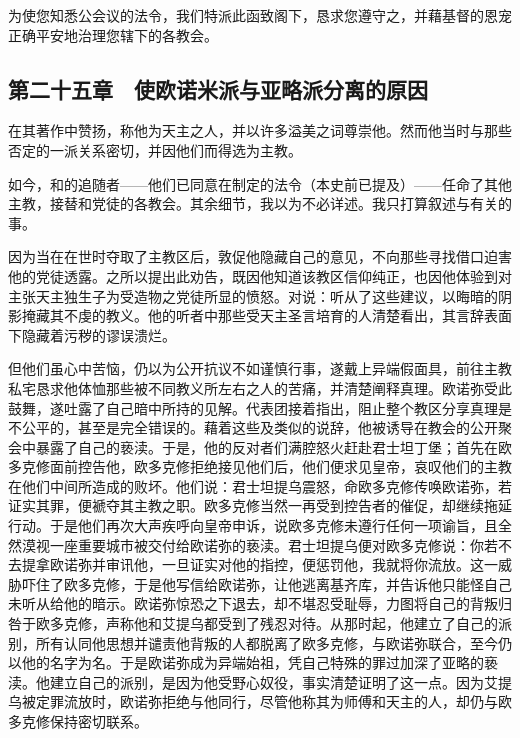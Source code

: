 为使您知悉公会议的法令，我们特派此函致阁下，恳求您遵守之，并藉基督的恩宠正确平安地治理您辖下的各教会。\par


\subsection{第二十五章　使欧诺米派与亚略派分离的原因}

在其著作中赞扬，称他为天主之人，并以许多溢美之词尊崇他。然而他当时与那些否定的一派关系密切，并因他们而得选为主教。\par

如今，和的追随者——他们已同意在制定的法令（本史前已提及）——任命了其他主教，接替和党徒的各教会。其余细节，我以为不必详述。我只打算叙述与有关的事。\par

因为当在在世时夺取了主教区后，敦促他隐藏自己的意见，不向那些寻找借口迫害他的党徒透露。之所以提出此劝告，既因他知道该教区信仰纯正，也因他体验到对主张天主独生子为受造物之党徒所显的愤怒。对说：听从了这些建议，以晦暗的阴影掩藏其不虔的教义。他的听者中那些受天主圣言培育的人清楚看出，其言辞表面下隐藏着污秽的谬误溃烂。\par

但他们虽心中苦恼，仍以为公开抗议不如谨慎行事，遂戴上异端假面具，前往主教私宅恳求他体恤那些被不同教义所左右之人的苦痛，并清楚阐释真理。欧诺弥受此鼓舞，遂吐露了自己暗中所持的见解。代表团接着指出，阻止整个教区分享真理是不公平的，甚至是完全错误的。藉着这些及类似的说辞，他被诱导在教会的公开聚会中暴露了自己的亵渎。于是，他的反对者们满腔怒火赶赴君士坦丁堡；首先在欧多克修面前控告他，欧多克修拒绝接见他们后，他们便求见皇帝，哀叹他们的主教在他们中间所造成的败坏。他们说：君士坦提乌震怒，命欧多克修传唤欧诺弥，若证实其罪，便褫夺其主教之职。欧多克修当然一再受到控告者的催促，却继续拖延行动。于是他们再次大声疾呼向皇帝申诉，说欧多克修未遵行任何一项谕旨，且全然漠视一座重要城市被交付给欧诺弥的亵渎。君士坦提乌便对欧多克修说：你若不去提拿欧诺弥并审讯他，一旦证实对他的指控，便惩罚他，我就将你流放。这一威胁吓住了欧多克修，于是他写信给欧诺弥，让他逃离基齐库，并告诉他只能怪自己未听从给他的暗示。欧诺弥惊恐之下退去，却不堪忍受耻辱，力图将自己的背叛归咎于欧多克修，声称他和艾提乌都受到了残忍对待。从那时起，他建立了自己的派别，所有认同他思想并谴责他背叛的人都脱离了欧多克修，与欧诺弥联合，至今仍以他的名字为名。于是欧诺弥成为异端始祖，凭自己特殊的罪过加深了亚略的亵渎。他建立自己的派别，是因为他受野心奴役，事实清楚证明了这一点。因为艾提乌被定罪流放时，欧诺弥拒绝与他同行，尽管他称其为师傅和天主的人，却仍与欧多克修保持密切联系。\par

